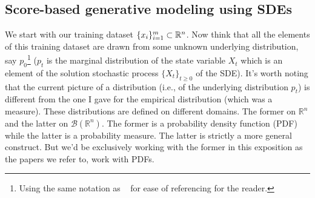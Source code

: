 \documentclass[11pt]{amsart}
\theoremstyle{plain}
\theoremstyle{definition}
\theoremstyle{remark}
\numberwithin{equation}{section}
\begin{document}
{\subsection{Score-based generative modeling using SDEs}

We start with our training dataset $\{x_i\}_{i=1}^m \newline \subset \mathbb{R}^n$. Now think that all the elements of this training dataset are drawn from some unknown underlying distribution, say $p_0$\footnote{Using the same notation as ~\cite{song2020} for ease of referencing for the reader.} ($p_t$ is the marginal distribution of the state variable $X_t$ which is an element of the solution stochastic process $\{X_t\}_{t \geq 0}$ of the SDE). It's worth noting that the current picture of a distribution (i.e., of the underlying distribution $p_t$) is different from the one I gave for the empirical distribution (which was a measure). These distributions are defined on different domains. The former on $\mathbb{R}^n$ and the latter on $\mathcal{B}(\mathbb{R}^n)$. The former is a probability density function (PDF) while the latter is a probability measure. The latter is strictly a more general construct. But we'd be exclusively working with the former in this exposition as the papers we refer to, work with PDFs.\\

}
\end{document}
